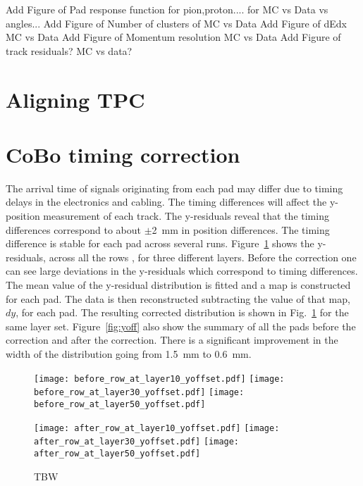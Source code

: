 Add Figure of Pad response function for pion,proton.... for MC vs Data vs angles...
Add Figure of Number of clusters of MC vs Data
Add Figure of dEdx MC vs Data
Add Figure of Momentum resolution MC vs Data
Add Figure of track residuals? MC vs data?


\section{Aligning TPC}

\section{CoBo timing correction}

The arrival time of signals originating from each pad may differ due to timing delays in the electronics and cabling. The timing differences will affect the y-position measurement of each track. The y-residuals reveal that the timing differences correspond to about $\pm$\SI{2}{\milli\metre} in position differences. The timing difference is stable for each pad across several runs. Figure~\ref{fig:coboCorr} shows the y-residuals, across all the rows , for three different layers. Before the correction one can see large deviations in the y-residuals which correspond to timing differences. The mean value of the y-residual distribution is fitted and a map is constructed for each pad. The data is then reconstructed subtracting the value of that map, $dy$, for each pad. The resulting corrected distribution is shown in Fig.~\ref{fig:coboCorr} for the same layer set. Figure~\ref{fig:yoff} also show the summary of all the pads before the correction and after the correction. There is a significant improvement in the width of the distribution going from \SI{1.5}{\milli\metre} to \SI{0.6}{\milli\metre}. 

\begin{figure}[!htb]
  \begin{center}
    \texttt{[image: before\_row\_at\_layer10\_yoffset.pdf]}
    \texttt{[image: before\_row\_at\_layer30\_yoffset.pdf]}
    \texttt{[image: before\_row\_at\_layer50\_yoffset.pdf]}
 
    \texttt{[image: after\_row\_at\_layer10\_yoffset.pdf]}
    \texttt{[image: after\_row\_at\_layer30\_yoffset.pdf]}
    \texttt{[image: after\_row\_at\_layer50\_yoffset.pdf]}
 
    \caption{TBW\label{TBD}}
  \end{center}
  \label{fig:coboCorr}
\end{figure}



